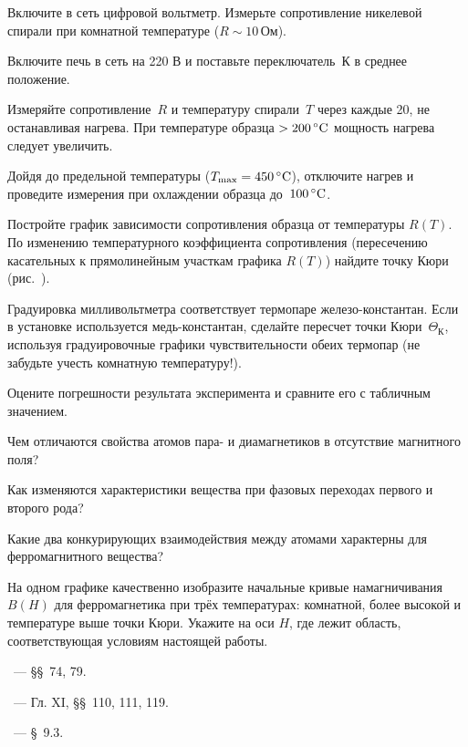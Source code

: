 \begin{lab:task}

    
\item
  Включите в сеть цифровой вольтметр. Измерьте сопротивление никелевой спирали
при комнатной температуре ($R \sim 10\,\text{Ом}$).
\item
  Включите печь в сеть на 220 В и поставьте переключатель~К в среднее
положение.

\item
  Измеряйте сопротивление~$R$ и температуру спирали~$T$ через каждые 20\oC,
  не останавливая нагрева. При температуре образца $>200\,^\circ\mathrm{C}$ мощность
нагрева следует увеличить.

Дойдя до предельной температуры ($T_\text{max} = 450\,^\circ\mathrm{C}$), отключите
нагрев и проведите измерения при охлаждении образца до~$100\,^\circ\mathrm{C}$.


\item
  Постройте график зависимости сопротивления образца от температуры $R(T)$. 
  По изменению температурного коэффициента 
  сопротивления (пересечению касательных к прямолинейным участкам
графика $R(T)$) найдите точку Кюри (рис.~).

\item
  Градуировка милливольтметра соответствует термопаре железо-кон\-стантан. 
  Если в установке используется медь-константан, сделайте пересчет точки 
  Кюри~$\Theta_{К}$, используя градуировочные графики чувствительности обеих 
термопар (не забудьте учесть комнатную температуру!).

\item
  Оцените погрешности результата эксперимента и сравните его с табличным
  значением.

\end{lab:task}


\begin{lab:questions}

\item
  Чем отличаются свойства атомов пара- и диамагнетиков 
  в отсутствие магнитного поля?
\item
  Как изменяются характеристики вещества при фазовых переходах первого и
второго рода?
\item
  Какие два конкурирующих взаимодействия между атомами характерны для
ферромагнитного вещества?
\item
  На одном графике качественно изобразите начальные кривые намагничивания
$B(H)$ для ферромагнетика при трёх температурах: комнатной, более высокой и
температуре выше точки Кюри. Укажите на оси $H$, где лежит область,
соответствующая условиям настоящей работы.

\end{lab:questions}


\begin{lab:literature}
\item \SivuhinIII~--- \S\S~74, 79.
\item \Kalashnikov~--- Гл. XI, \S\S~110, 111, 119.
\item \Kirichenko~--- \S~9.3.
\end{lab:literature}

